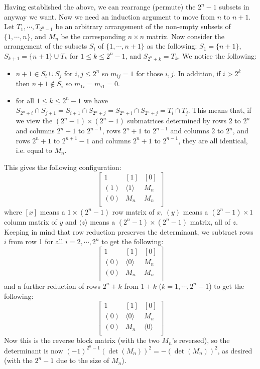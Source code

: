 \documentclass[11pt,a4paper]{article}
\newcommand{\<}{\langle}
\renewcommand{\>}{\rangle}
\begin{document}
\begin{enumerate}
	Having established the above, we can rearrange (permute) the $2^n-1$ subsets in anyway we want. Now we need an induction argument to move from $n$ to $n+1$. Let $T_1, \cdots , T_{2^n-1}$ be an arbitrary arrangement of the non-empty subsets of $\{1, \cdots , n\}$, and $M_n$ be the corresponding $n\times n$ matrix. Now consider the arrangement of the subsets $S_i$ of $\{1, \cdots , n+1\}$ as the following: 
	$S_1=\{n+1\}$, $S_{k+1}=\{n+1\}\cup T_k$ for $1\le k\le 2^n-1$, and $S_{2^n+k}=T_k$. We notice the following: 
	\begin{itemize}
		\item $n+1\in S_i\cup S_j$ for $i, j\le 2^n$ so $m_{ij}=1$ for those $i, j$. In addition, if $i>2^k$ then $n+1\not\in S_i$ so $m_{1i}=m_{i1}=0$. 
		
		\item for all $1\le k\le 2^n-1$ we have $S_{2^n+i}\cap S_{j+1}=S_{i+1}\cap S_{2^n+j}=S_{2^n+i}\cap S_{2^n+j}=T_i\cap T_j$. This means that, if we view the $(2^n-1)\times (2^n-1)$ submatrices determined by rows $2$ to $2^n$ and columns $2^n+1$ to $2^{n-1}$, rows $2^n+1$ to $2^{n-1}$ and columns $2$ to $2^n$, and rows $2^n+1$ to $2^{n+1}-1$ and columns $2^n+1$ to $2^{n-1}$, they are all identical, i.e. equal to $M_n$. 
	\end{itemize}
	This gives the following configuration: 
	\[
	\left[\begin{array}{c|c|c}
	1 & [1] & [0]\\
	\hline
	(1) & \<1\> & M_n\\
	\hline
	(0) & M_n & M_n\\ 
	\end{array}\right]
	\]
	where $[x]$ means a $1\times (2^n-1)$ row matrix of $x$, $(y)$ means a $(2^n-1)\times 1$ column matrix of $y$ and $\<z\>$ means a $(2^n-1)\times (2^n-1)$ matrix, all of $z$. Keeping in mind that row reduction preserves the determinant, we subtract rows $i$ from row 1 for all $i=2, \cdots , 2^n$ to get the following: 
	\[
	\left[\begin{array}{c|c|c}
	1 & [1] & [0]\\
	\hline
	(0) & \<0\> & M_n\\
	\hline
	(0) & M_n & M_n\\ 
	\end{array}\right]
	\]
	and a further reduction of rows $2^n+k$ from $1+k$ ($k=1, \cdots , 2^n-1$) to get the following:
	\[
	\left[\begin{array}{c|c|c}
	1 & [1] & [0]\\
	\hline
	(0) & \<0\> & M_n\\
	\hline
	(0) & M_n & \<0\>\\ 
	\end{array}\right]
	\]
	Now this is the reverse block matrix (with the two $M_n$'s reversed), so the determinant is now $(-1)^{2^n-1}(\det(M_n))^2=-(\det(M_n))^2$, as desired (with the $2^n-1$ due to the size of $M_n$). 
	

\end{enumerate}
\end{document}
